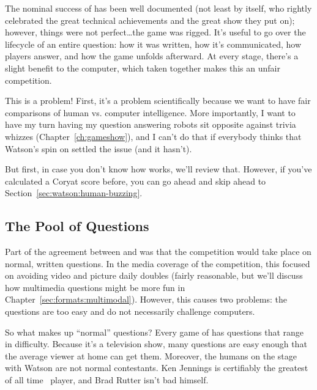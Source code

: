The nominal success of \watson{} has been well documented (not least by 
itself, who rightly celebrated the great technical achievements and the great
show they put on); however,
things were not perfect\dots the game was rigged.
%
It's useful to go over the lifecycle of an entire question: how it was
written, how it's communicated, how players answer, and how the game
unfolds afterward.
%
At every stage, there's a slight benefit to the computer, which taken
together makes this an unfair competition.

This is a problem!  First, it's a problem scientifically because we
want to have fair comparisons of human vs. computer intelligence.
%
More importantly, I want to have my turn having my question answering
robots sit opposite against trivia whizzes (Chapter~\ref{ch:gameshow}),
and I can't do that if everybody thinks that Watson's spin
on \jeopardy{} settled the issue (and it hasn't).


But first, in case you don't know how \jeopardy{} works, we'll review
that.
%
However, if you've calculated a Coryat score before, you can go ahead
and skip ahead to Section~\ref{sec:watson:human-buzzing}.


\subsection{The Pool of Questions}


Part of the agreement between \jeopardy{} and  was that the
competition would take place on normal, written questions.
%
In the media coverage of the competition, this focused on avoiding
video and picture daily doubles (fairly reasonable, but we'll discuss
how multimedia questions might be more fun in Chapter~\ref{sec:formats:multimodal}).
%
However, this causes two problems: the questions are too easy and do
not necessarily challenge computers.

So what makes up ``normal'' questions?
%
Every game of \jeopardy{} has questions that range in difficulty.
%
Because it's a television show, many questions are easy enough that
the average viewer at home can get them.
%
Moreover, the humans on the stage with Watson are not normal contestants.
%
Ken Jennings is certifiably the greatest of all
time~\citep[]{low-20} \jeopardy{} player, and Brad Rutter
isn't bad himself.

